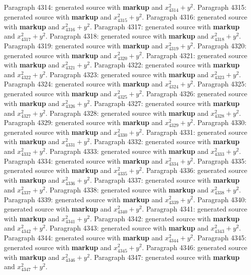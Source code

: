 \documentclass{article}
\begin{document}
Paragraph 4314: generated source with \textbf{markup} and $x_{4314}^2 + y^2$.
Paragraph 4315: generated source with \textbf{markup} and $x_{4315}^2 + y^2$.
Paragraph 4316: generated source with \textbf{markup} and $x_{4316}^2 + y^2$.
Paragraph 4317: generated source with \textbf{markup} and $x_{4317}^2 + y^2$.
Paragraph 4318: generated source with \textbf{markup} and $x_{4318}^2 + y^2$.
Paragraph 4319: generated source with \textbf{markup} and $x_{4319}^2 + y^2$.
Paragraph 4320: generated source with \textbf{markup} and $x_{4320}^2 + y^2$.
Paragraph 4321: generated source with \textbf{markup} and $x_{4321}^2 + y^2$.
Paragraph 4322: generated source with \textbf{markup} and $x_{4322}^2 + y^2$.
Paragraph 4323: generated source with \textbf{markup} and $x_{4323}^2 + y^2$.
Paragraph 4324: generated source with \textbf{markup} and $x_{4324}^2 + y^2$.
Paragraph 4325: generated source with \textbf{markup} and $x_{4325}^2 + y^2$.
Paragraph 4326: generated source with \textbf{markup} and $x_{4326}^2 + y^2$.
Paragraph 4327: generated source with \textbf{markup} and $x_{4327}^2 + y^2$.
Paragraph 4328: generated source with \textbf{markup} and $x_{4328}^2 + y^2$.
Paragraph 4329: generated source with \textbf{markup} and $x_{4329}^2 + y^2$.
Paragraph 4330: generated source with \textbf{markup} and $x_{4330}^2 + y^2$.
Paragraph 4331: generated source with \textbf{markup} and $x_{4331}^2 + y^2$.
Paragraph 4332: generated source with \textbf{markup} and $x_{4332}^2 + y^2$.
Paragraph 4333: generated source with \textbf{markup} and $x_{4333}^2 + y^2$.
Paragraph 4334: generated source with \textbf{markup} and $x_{4334}^2 + y^2$.
Paragraph 4335: generated source with \textbf{markup} and $x_{4335}^2 + y^2$.
Paragraph 4336: generated source with \textbf{markup} and $x_{4336}^2 + y^2$.
Paragraph 4337: generated source with \textbf{markup} and $x_{4337}^2 + y^2$.
Paragraph 4338: generated source with \textbf{markup} and $x_{4338}^2 + y^2$.
Paragraph 4339: generated source with \textbf{markup} and $x_{4339}^2 + y^2$.
Paragraph 4340: generated source with \textbf{markup} and $x_{4340}^2 + y^2$.
Paragraph 4341: generated source with \textbf{markup} and $x_{4341}^2 + y^2$.
Paragraph 4342: generated source with \textbf{markup} and $x_{4342}^2 + y^2$.
Paragraph 4343: generated source with \textbf{markup} and $x_{4343}^2 + y^2$.
Paragraph 4344: generated source with \textbf{markup} and $x_{4344}^2 + y^2$.
Paragraph 4345: generated source with \textbf{markup} and $x_{4345}^2 + y^2$.
Paragraph 4346: generated source with \textbf{markup} and $x_{4346}^2 + y^2$.
Paragraph 4347: generated source with \textbf{markup} and $x_{4347}^2 + y^2$.
\end{document}
